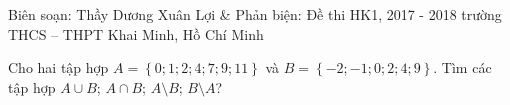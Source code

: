	\begin{name}
		{Biên soạn: Thầy Dương Xuân Lợi \& Phản biện: }
		{Đề thi HK1, 2017 - 2018 trường THCS – THPT Khai Minh, Hồ Chí Minh}
	\end{name}
	
	\setcounter{bt}{0}
	
	\begin{bt}%
		Cho hai tập hợp $ A=\left\{0; 1; 2; 4; 7; 9; 11 \right\} $ và $ B=\left\{-2; -1; 0; 2; 4; 9 \right\} $. Tìm các tập hợp $ A \cup B $; $ A \cap B $; $ A \setminus B $; $ B \setminus A $?
	\end{bt}
	
